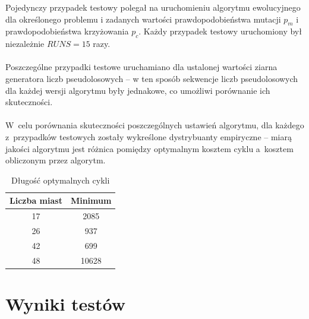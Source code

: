 \documentclass[12pt, a4paper]{article}
\begin{document}
Pojedynczy przypadek testowy polegał na uruchomieniu algorytmu ewolucyjnego dla określonego 
problemu i zadanych wartości prawdopodobieństwa mutacji $p_m$ i prawdopodobieństwa 
krzyżowania $p_c$. Każdy przypadek testowy uruchomiony był niezależnie $RUNS = 15$ razy.\\
\\
Poszczególne przypadki testowe uruchamiano dla ustalonej wartości ziarna generatora 
liczb pseudolosowych -- w ten sposób sekwencje liczb pseudolosowych dla każdej wersji 
algorytmu były jednakowe, co umożliwi porównanie ich skuteczności.\\
\\
W~celu porównania skuteczności poszczególnych ustawień algorytmu, dla każdego z~przypadków testowych zostały wykreślone 
dystrybuanty empiryczne -- miarą jakości algorytmu jest różnica pomiędzy optymalnym 
kosztem cyklu a~kosztem obliczonym przez algorytm.

\begin{table}[h]
  \centering
  \begin{tabular}{ | c | c | }
    \hline
    Liczba miast & Minimum\\
    \hline
    17 & 2085\\
    \hline
    26 & 937\\
    \hline
    42 & 699\\
    \hline
    48 & 10628\\
    \hline
  \end{tabular}
  \caption{Długość optymalnych cykli}
\end{table}

\section{Wyniki testów}
\end{document}
